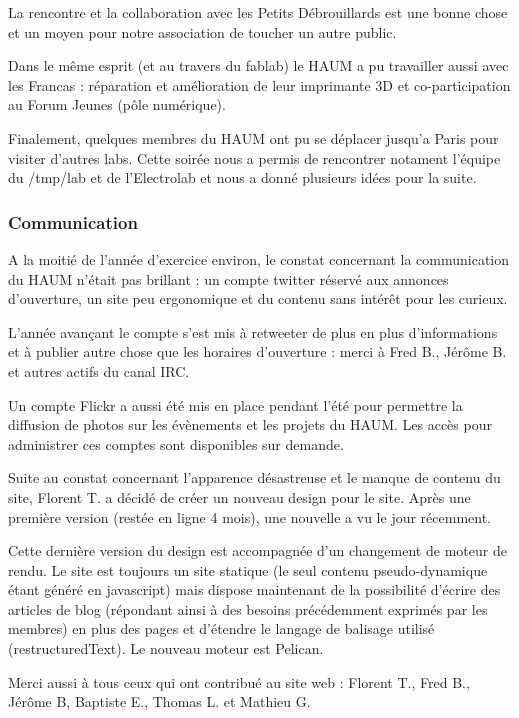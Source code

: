 \documentclass[11pt]{article}
\begin{document}
La rencontre et la collaboration avec les Petits Débrouillards est une bonne chose et un moyen pour notre association de toucher un autre public.

Dans le même esprit (et au travers du fablab) le HAUM a pu travailler aussi avec les Francas : réparation et amélioration de leur imprimante 3D et co-participation au Forum Jeunes (pôle numérique).

Finalement, quelques membres du HAUM ont pu se déplacer jusqu'a Paris pour visiter d'autres labs. Cette soirée nous a permis de rencontrer notament l'équipe du /tmp/lab et de l'Electrolab et nous a donné plusieurs idées pour la suite.
    
\subsubsection{Communication}

A la moitié de l'année d'exercice environ, le constat concernant la communication du HAUM n'était pas brillant : un compte twitter réservé aux annonces d'ouverture, un site peu ergonomique et du contenu sans intérêt pour les curieux.

L'année avançant le compte s'est mis à retweeter de plus en plus d'informations et à publier autre chose que les horaires d'ouverture : merci à Fred B., Jérôme B. et autres actifs du canal IRC.

Un compte Flickr a aussi été mis en place pendant l'été pour permettre la diffusion de photos sur les évènements et les projets du HAUM. Les accès pour administrer ces comptes sont disponibles sur demande.

Suite au constat concernant l'apparence désastreuse et le manque de contenu du site, Florent T. a décidé de créer un nouveau design pour le site. Après une première version (restée en ligne 4 mois), une nouvelle a vu le jour récemment.

Cette dernière version du design est accompagnée d'un changement de moteur de rendu. Le site est toujours un site statique (le seul contenu pseudo-dynamique étant généré en javascript) mais dispose maintenant de la possibilité d'écrire des articles de blog (répondant ainsi à des besoins précédemment exprimés par les membres) en plus des pages et d'étendre le langage de balisage utilisé (restructuredText). Le nouveau moteur est Pelican.

Merci aussi à tous ceux qui ont contribué au site web : Florent T., Fred B., Jérôme B, Baptiste E., Thomas L. et Mathieu G.
\end{document}
